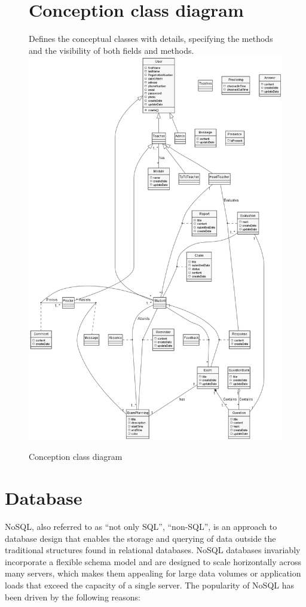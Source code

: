 \documentclass[]{uc2pfecaneva}
\begin{document}
    \begin{figure}
        \section{Conception class diagram}
        \raggedright Defines the conceptual classes with details, specifying the methods and the visibility of both fields and methods.
        \linebreak
        \includegraphics[width=\textwidth]{images/CCD}
        \caption{Conception class diagram}
    \end{figure}
    \clearpage


    \raggedright\section{Database}
    NoSQL, also referred to as “not only SQL”, “non-SQL”, is an approach to database design that enables the storage and querying of data outside the traditional structures found in relational databases.\linebreak
    \linebreak
    NoSQL databases invariably incorporate a flexible schema model and are designed to scale horizontally across many servers, which makes them appealing for large data volumes or application loads that exceed the capacity of a single server.
    The popularity of NoSQL has been driven by the following reasons:
\end{document}
